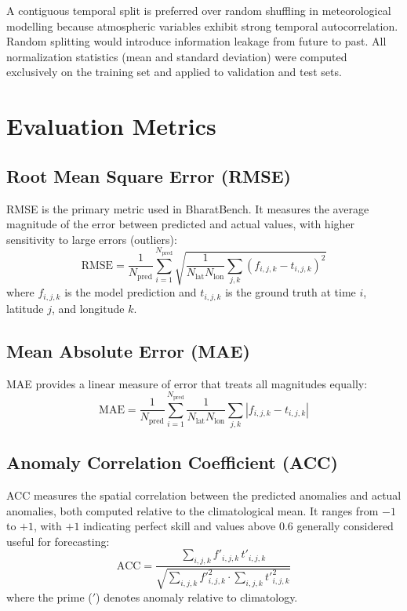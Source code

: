 \documentclass[12pt,a4paper,oneside]{report}
\begin{document}
A contiguous temporal split is preferred over random shuffling in meteorological modelling because atmospheric variables exhibit strong temporal autocorrelation. Random splitting would introduce information leakage from future to past. All normalization statistics (mean and standard deviation) were computed exclusively on the training set and applied to validation and test sets.

\section{Evaluation Metrics}

\subsection{Root Mean Square Error (RMSE)}
RMSE is the primary metric used in BharatBench. It measures the average magnitude of the error between predicted and actual values, with higher sensitivity to large errors (outliers):
\begin{equation}
\text{RMSE} = \frac{1}{N_{\text{pred}}} \sum_{i=1}^{N_{\text{pred}}} \sqrt{\frac{1}{N_{\text{lat}} N_{\text{lon}}} \sum_{j,k} (f_{i,j,k} - t_{i,j,k})^2}
\end{equation}
where $f_{i,j,k}$ is the model prediction and $t_{i,j,k}$ is the ground truth at time $i$, latitude $j$, and longitude $k$.

\subsection{Mean Absolute Error (MAE)}
MAE provides a linear measure of error that treats all magnitudes equally:
\begin{equation}
\text{MAE} = \frac{1}{N_{\text{pred}}} \sum_{i=1}^{N_{\text{pred}}} \frac{1}{N_{\text{lat}} N_{\text{lon}}} \sum_{j,k} |f_{i,j,k} - t_{i,j,k}|
\end{equation}

\subsection{Anomaly Correlation Coefficient (ACC)}
ACC measures the spatial correlation between the predicted anomalies and actual anomalies, both computed relative to the climatological mean. It ranges from $-1$ to $+1$, with $+1$ indicating perfect skill and values above 0.6 generally considered useful for forecasting:
\begin{equation}
\text{ACC} = \frac{\sum_{i,j,k} f'_{i,j,k} \, t'_{i,j,k}}{\sqrt{\sum_{i,j,k} f'^2_{i,j,k} \cdot \sum_{i,j,k} t'^2_{i,j,k}}}
\end{equation}
where the prime ($'$) denotes anomaly relative to climatology.
\end{document}

